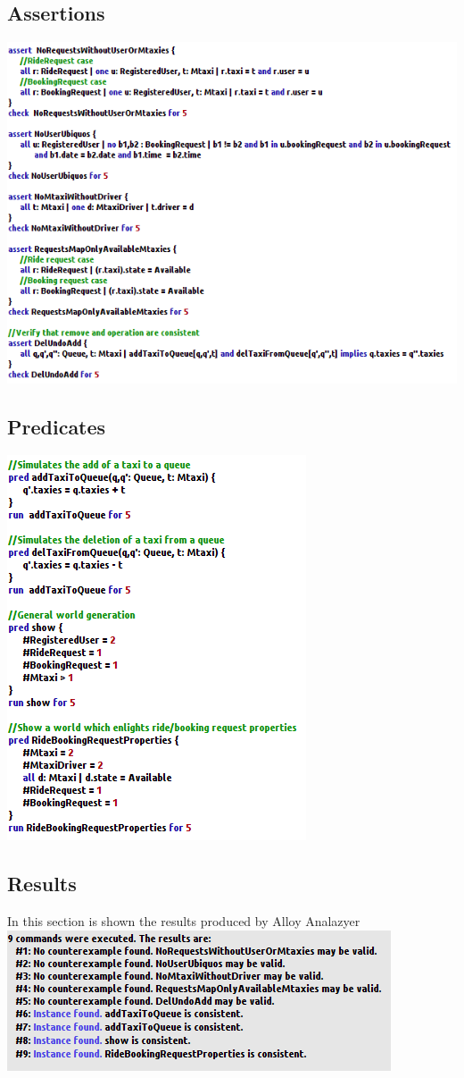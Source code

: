 \documentclass[11pt,titlepage]{article} %
\begin{document}
	\subsection{Assertions}
		\includegraphics[scale=0.8]{assertions.png}
	\subsection{Predicates}
		\includegraphics[scale=0.8]{preds.png}
	\newpage
	\subsection{Results}
		In this section is shown the results produced by Alloy Analazyer\newline\newline
		\includegraphics[scale=0.8]{results.png}
\end{document}
